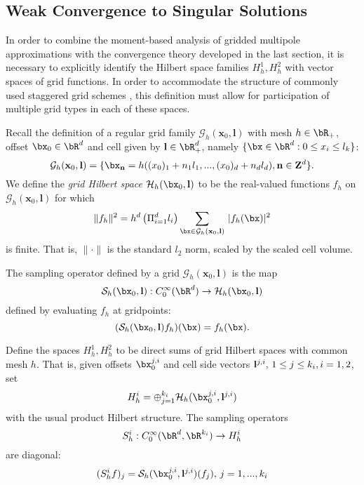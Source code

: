  
\subsection{Weak Convergence to Singular Solutions}

In order to combine the moment-based analysis of gridded multipole
approximations with the convergence theory developed in the last
section, it is necessary to explicitly identify the Hilbert space
families $H^1_h,H^2_h$ with vector spaces of grid functions. In order
to accommodate the structure of commonly used staggered grid schemes
\cite[]{moczoetal:06}, this definition must allow for participation of
multiple grid types in each of these spaces.

Recall the definition of a regular grid family $\mathcal G_h(\mathbf
x_0,\mathbf l)$ with mesh $h \in \bR_+$, offset $\bx_0 \in
\bR^d$ and cell given by ${\bf l} \in \bR_+^d$, namely $\{\bx \in
\bR^d: 0 \le x_i\le l_k\}$:
\[
	\mathcal G_h(\mathbf x_0,\mathbf l) = \{\bx_{\bf n} =
        h((x_0)_1+n_1l_1,...,(x_0)_d+n_dl_d), {\bf n} \in {\bf Z}^d\}.
\]
We define the {\em grid Hilbert space} $\mathcal H_h(\bx_0, {\bf l})$ to be the real-valued
functions $f_h$ on $\mathcal G_h(\mathbf x_0,\mathbf l)$ for which
\[
\|f_h\|^2 = h^d \left(\Pi_{i=1}^dl_i\right) \sum_{\bx \in \mathcal G_h(\mathbf x_0,\mathbf l)}\,
|f_h(\bx)|^2
\]
is finite. That is, $\| \cdot \|$ is the standard $l_2$ norm, scaled
by the scaled cell volume.

The sampling operator defined by a grid $\mathcal G_h(\mathbf
x_0,\mathbf l)$ is the map
\[
\mathcal S_h(\bx_0,{\bf l}): C^{\infty}_0(\bR^d) \rightarrow \mathcal
H_h(\bx_0, {\bf l})
\]
defined by evaluating $f_h$ at gridpoints:
\[
(\mathcal S_h(\bx_0,{\bf l})f_h)(\bx) = f_h(\bx).
\]

Define the spaces $H^1_h,H^2_h$ to be direct sums of grid Hilbert
spaces with common mesh $h$. That is, given offsets $\bx_0^{j,i}$ and
cell side vectors ${\bf l}^{j,i}, \,1 \le j \le k_i, i=1,2$, set
\begin{equation}
\label{eq:def-hilb}
H^i_h = \oplus_{j=1}^{k_i}\mathcal H_h(\bx_0^{j,i},{\bf l}^{j,i})
\end{equation}
with the usual product Hilbert structure. The sampling operators
\[
S^i_h: C^{\infty}_0(\bR^d,\bR^{k_i}) \rightarrow H^i_h
\]
are diagonal:
\begin{equation}
\label{eq:def-samp}
(S^i_h f)_j = \mathcal S_h(\bx_0^{j,i},{\bf l}^{j,i})(f_j),
\,j=1,...,k_i
\end{equation}

